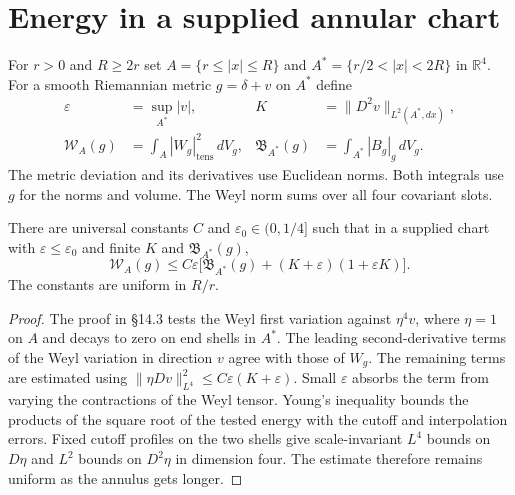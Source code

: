\section{Energy in a supplied annular chart}

\begin{definition}
\label{def:annular-data}
For $r>0$ and $R\ge2r$ set
$A=\{r\le |x|\le R\}$ and $A^*=\{r/2<|x|<2R\}$ in $\mathbb R^4$.
For a smooth Riemannian metric $g=\delta+v$ on $A^*$ define
\[
\begin{aligned}
  \varepsilon &= \sup_{A^*}|v|,
  & K &= \lVert D^2v\rVert_{L^2(A^*,dx)},\\
  \mathcal W_A(g) &= \int_A |W_g|_{\mathrm{tens}}^2\,dV_g,
  & \mathfrak B_{A^*}(g) &= \int_{A^*}|B_g|_g\,dV_g .
\end{aligned}
\]
The metric deviation and its derivatives use Euclidean norms. Both
integrals use $g$ for the norms and volume. The Weyl norm sums over
all four covariant slots.
\end{definition}

\begin{theorem}
\label{thm:one-chart-energy}
There are universal constants $C$ and $\varepsilon_0\in(0,1/4]$ such
that in a supplied chart with $\varepsilon\le\varepsilon_0$ and finite
$K$ and $\mathfrak B_{A^*}(g)$,
\[
  \mathcal W_A(g)\le C\varepsilon
    \bigl[\mathfrak B_{A^*}(g)+(K+\varepsilon)(1+\varepsilon K)\bigr].
\]
The constants are uniform in $R/r$.
\end{theorem}

\begin{proof}
The proof in \S14.3 tests the Weyl first variation against $\eta^4v$,
where $\eta=1$ on $A$ and decays to zero on end shells in $A^*$.
The leading second-derivative terms of the Weyl variation in direction
$v$ agree with those of $W_g$. The remaining terms are estimated using
$\lVert\eta Dv\rVert_{L^4}^2\le C\varepsilon(K+\varepsilon)$.
Small $\varepsilon$ absorbs the term from varying the contractions of
the Weyl tensor. Young's inequality bounds the products of the square
root of the tested energy with the cutoff and interpolation errors.
Fixed cutoff profiles on the two shells give scale-invariant
$L^4$ bounds on $D\eta$ and $L^2$ bounds on $D^2\eta$ in dimension
four. The estimate therefore remains uniform as the annulus gets longer.
\end{proof}

